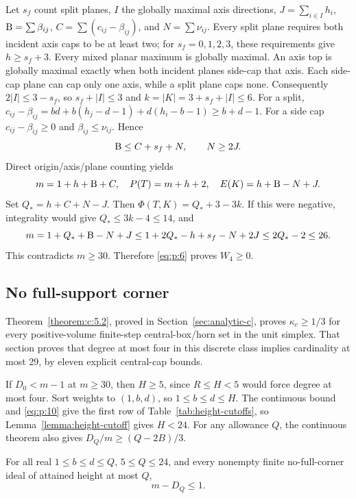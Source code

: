 Let \(s_f\) count split planes, \(I\) the globally maximal axis directions,
\(J=\sum_{i\in I}h_i\), \(\mathrm{B}=\sum\beta_{ij}\),
\(C=\sum(c_{ij}-\beta_{ij})\), and \(N=\sum\nu_{ij}\).
Every split plane requires both incident axis caps to be at least two;
for \(s_f=0,1,2,3\), these requirements give \(h\ge s_f+3\).
Every mixed planar maximum is globally maximal. An axis top is globally
maximal exactly when both incident planes side-cap that axis.
Each side-cap plane can cap only one axis, while a split plane caps none.
Consequently \(2|I|\le3-s_f\), so \(s_f+|I|\le3\) and
\(k=|K|=3+s_f+|I|\le6\).
For a split,
\(c_{ij}-\beta_{ij}
=bd+b(h_j-d-1)+d(h_i-b-1)\ge b+d-1\).
For a side cap \(c_{ij}-\beta_{ij}\ge0\) and \(\beta_{ij}\le\nu_{ij}\).
Hence
\[
\mathrm{B}\le C+s_f+N,\qquad N\ge2J.
\]
Direct origin/axis/plane counting yields
\[
m=1+h+\mathrm{B}+C,\quad P(T)=m+h+2,\quad E(K)=h+\mathrm{B}-N+J.
\]
Set \(Q_*=h+C+N-J\). Then \(\Phi(T,K)=Q_*+3-3k\).
If this were negative, integrality would give \(Q_*\le3k-4\le14\), and
\[
m=1+Q_*+\mathrm{B}-N+J
\le1+2Q_*-h+s_f-N+2J
\le2Q_*-2\le26.
\]
This contradicts \(m\ge30\). Therefore \eqref{eq:p:6} proves \(W_4\ge0\).

\subsection{No full-support corner}\label{sec:p8}

Theorem~\ref{theorem:c:5.2}, proved in Section~\ref{sec:analytic-c},
proves \(\kappa_c\ge1/3\) for every positive-volume finite-step
central-box/horn set in the unit simplex.
That section proves that degree at most four in this discrete class
implies cardinality at most 29, by eleven explicit central-cap bounds.

If \(D_0<m-1\) at \(m\ge30\), then \(H\ge5\), since \(R\le H<5\)
would force degree at most four. Sort weights to \((1,b,d)\), so
\(1\le b\le d\le H\). The continuous bound and \eqref{eq:p:10}
give the first row of Table~\ref{tab:height-cutoffs}, so
Lemma~\ref{lemma:height-cutoff} gives \(H<24\).
For any allowance \(Q\), the continuous theorem also gives
\(D_Q/m\ge(Q-2B)/3\).

\begin{finitelemma}\label{finite:no-corner-interval}
For all real
\(1\le b\le d\le Q\), \(5\le Q\le24\), and every nonempty finite
no-full-corner ideal of attained height at most \(Q\),
\[
m-D_Q\le1.
\]

\end{finitelemma}

